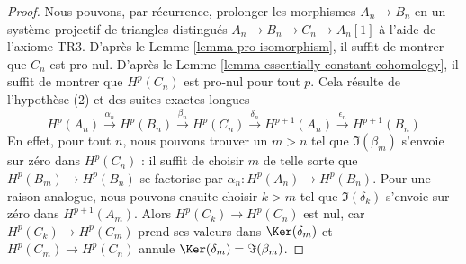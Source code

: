 \begin{proof}
Nous pouvons, par récurrence, prolonger les morphismes $A_n \to B_n$ en un
système projectif de triangles distingués
$A_n \to B_n \to C_n \to A_n[1]$ à l'aide de l'axiome TR3.
D'après le Lemme \ref{lemma-pro-isomorphism}, il suffit de montrer que $C_n$
est pro-nul. D'après le Lemme
\ref{lemma-essentially-constant-cohomology}, il suffit de montrer que
$H^p(C_n)$ est pro-nul pour tout $p$.
Cela résulte de l'hypothèse (2) et des suites exactes longues
$$
H^p(A_n) \xrightarrow{\alpha_n} H^p(B_n)
\xrightarrow{\beta_n}
H^p(C_n) \xrightarrow{\delta_n} H^{p + 1}(A_n)
\xrightarrow{\epsilon_n}
H^{p + 1}(B_n)
$$
En effet, pour tout $n$, nous pouvons trouver un $m > n$ tel que
$\Im(\beta_m)$ s'envoie sur zéro dans $H^p(C_n)$ : il suffit de choisir $m$
de telle sorte que $H^p(B_m) \to H^p(B_n)$ se factorise par
$\alpha_n : H^p(A_n) \to H^p(B_n)$. Pour une raison analogue, nous pouvons
ensuite choisir $k > m$ tel que $\Im(\delta_k)$ s'envoie sur zéro dans
$H^{p + 1}(A_m)$. Alors $H^p(C_k) \to H^p(C_n)$ est nul, car
$H^p(C_k) \to H^p(C_m)$ prend ses valeurs dans $\Ker(\delta_m)$ et
$H^p(C_m) \to H^p(C_n)$ annule
$\Ker(\delta_m) = \Im(\beta_m)$.
\end{proof}














